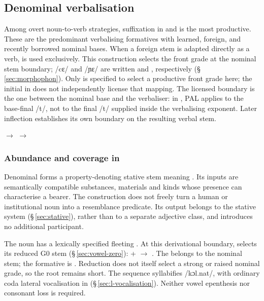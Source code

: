 \subsection{Denominal verbalisation}

Among overt noun-to-verb strategies, suffixation in  and
 is the most productive. These are the predominant verbalising
formatives with learned, foreign, and recently borrowed nominal bases.
When a foreign stem is adapted directly as a verb,  is used
exclusively. This construction selects the front grade at the nominal
stem boundary; /cɛ/ and /ɲɛ/ are written  and ,
respectively (§\,\ref{sec:morphophon}). Only  is specified to select a productive front grade here;
the initial  in  does not independently license that mapping. The licensed
boundary is the one between the nominal base and the verbaliser: in
, PAL applies to the base-final /t/, not to the final
/t/ supplied inside the verbalising exponent. Later inflection establishes
its own boundary on the resulting verbal stem.

\pex
\a {} $\rightarrow$  
\a {} $\rightarrow$  
\xe

\subsubsection{Abundance and coverage in }\label{sec:abundance-at}

Denominal  forms a property-denoting stative stem meaning
.
Its inputs are semantically compatible substances, materials and kinds whose
presence can characterise a bearer. The construction does not freely turn a
human or institutional noun into a resemblance predicate. Its output belongs
to the stative system (§\,\ref{sec:stative}), rather than to a separate
adjective class, and introduces no additional participant.

The noun   has a lexically specified fleeting
. At this derivational boundary,  selects its reduced
G0 stem  (§\,\ref{sec:vowel-zero}):
\ex
{} +  $\rightarrow$ 
.
\xe
The  belongs to the nominal stem; the formative is .
Reduction does not itself select a strong or raised nominal grade, so the
root  remains short. The sequence syllabifies /kɔl.nat/, with
ordinary coda lateral vocalisation in
(§\,\ref{sec:l-vocalisation}). Neither vowel epenthesis nor consonant
loss is required.

